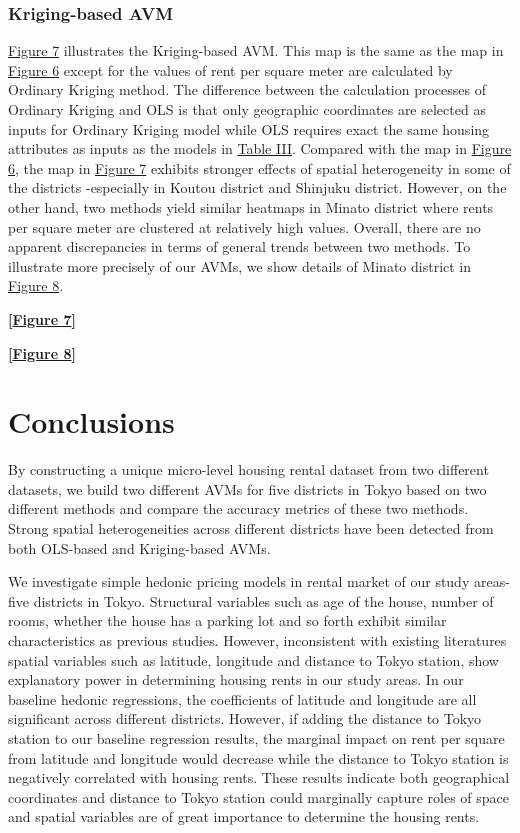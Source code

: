\documentclass[a4paper, 12pt]{article} %
\begin{document}
\subsubsection{Kriging-based AVM}
\hyperref[fig7]{Figure 7} illustrates the Kriging-based AVM. This map is the same as the map in \hyperref[fig6]{Figure 6} except for the values of rent per square meter are calculated by Ordinary Kriging method. The difference between the calculation processes of Ordinary Kriging and OLS is that only geographic coordinates are selected as inputs for Ordinary Kriging model while OLS requires exact the same housing attributes as inputs as the models in \hyperref[tb3]{Table III}. Compared with the map in \hyperref[fig6]{Figure 6}, the map in \hyperref[fig7]{Figure 7} exhibits stronger effects of spatial heterogeneity in some of the districts -especially in Koutou district and Shinjuku district. However, on the other hand, two methods yield similar heatmaps in Minato district where rents per square meter are clustered at relatively high values. Overall, there are no apparent discrepancies in terms of general trends between two methods. To illustrate more precisely of our AVMs, we show details of Minato district in \hyperref[fig8]{Figure 8}. 

\bigskip
 \centerline{\bf [\hyperref[fig7]{Figure 7}]}
\bigskip

\bigskip
 \centerline{\bf [\hyperref[fig8]{Figure 8}]}
\bigskip

\section{Conclusions}
By constructing a unique micro-level housing rental dataset from two different datasets, we build two different AVMs for five districts in Tokyo based on two different methods and compare the accuracy metrics of these two methods. Strong spatial heterogeneities across different districts have been detected from both OLS-based and Kriging-based AVMs. 

We investigate simple hedonic pricing models in rental market of our study areas- five districts in Tokyo. Structural variables such as age of the house, number of rooms, whether the house has a parking lot and so forth exhibit similar characteristics as previous studies. However, inconsistent with existing literatures spatial variables such as latitude, longitude and distance to Tokyo station, show explanatory power in determining housing rents in our study areas. In our baseline hedonic regressions, the coefficients of latitude and longitude are all significant across different districts. However, if adding the distance to Tokyo station to our baseline regression results, the marginal impact on rent per square from latitude and longitude would decrease while the distance to Tokyo station is negatively correlated with housing rents. These results indicate both geographical coordinates and distance to Tokyo station could marginally capture roles of space and spatial variables are of great importance to determine the housing rents.
\end{document}
